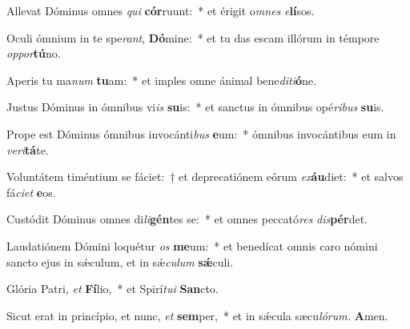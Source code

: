 \item Allevat Dóminus omnes \textit{qui} \textbf{cór}ruunt:~* et érigit o\textit{mnes} \textit{e}\textbf{lí}sos.
\item Oculi ómnium in te spe\textit{rant}, \textbf{Dó}mine:~* et tu das escam illórum in témpore \textit{oppor}\textbf{tú}no.
\item Aperis tu ma\textit{num} \textbf{tu}am:~* et imples omne ánimal bene\textit{diti}\textbf{ó}ne.
\item Justus Dóminus in ómnibus vi\textit{is} \textbf{su}is:~* et sanctus in ó\-mnibus opé\textit{ribus} \textbf{su}is.
\item Prope est Dóminus ómnibus invocánti\textit{bus} \textbf{e}um:~* ó\-mnibus invocántibus eum in \textit{veri}\textbf{tá}te.
\item Voluntátem timéntium se fáciet:~† et deprecatiónem eórum \textit{ex}\textbf{áu}diet:~* et salvos fá\textit{ciet} \textbf{e}os.
\item Custódit Dóminus omnes di\textit{li}\textbf{gén}tes se:~* et o\-mnes peccató\textit{res} \textit{dis}\textbf{pér}det.
\item Laudatiónem Dómini loquétur \textit{os} \textbf{me}um:~* et benedícat o\-mnis caro nómini sancto ejus in sǽculum, et in sǽ\hspace*{0.02em}\textit{cu}\textit{lum} \textbf{sǽ}culi.
\item Glória Patri, \textit{et} \textbf{Fí}lio,~* et Spirí\tinyhspace\textit{tui} \textbf{San}cto.
\item Sicut erat in princípio, et nunc, \textit{et} \textbf{sem}per,~* et in sǽcula sæcu\tinyhspace\textit{lórum.} \textbf{A}men.